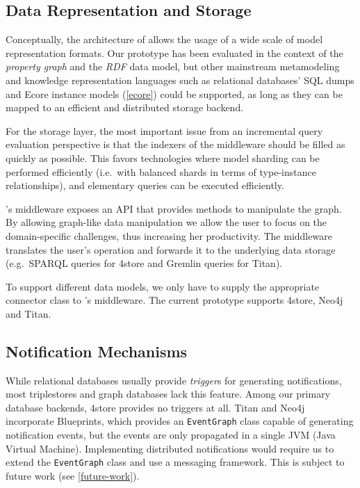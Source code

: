 \subsection{Data Representation and Storage}
\label{storage}

Conceptually, the architecture of \iqd{} allows the usage of a wide scale of model representation formats. Our prototype has been evaluated in the context of the \emph{property graph} and the \emph{RDF} data model, but other mainstream metamodeling and knowledge representation languages such as relational databases' SQL dumps and Ecore instance models (\autoref{ecore}) could be supported, as long as they can be mapped to an efficient and distributed storage backend.

For the storage layer, the most important issue from an incremental query evaluation perspective is that the indexers of the middleware should be filled as quickly as possible. This favors technologies where model sharding can be performed efficiently (i.e.\ with balanced shards in terms of type-instance relationships), and elementary queries can be executed efficiently.

\iqd{}'s middleware exposes an API that provides methods to manipulate the graph. By allowing graph-like data manipulation we allow the user to focus on the domain-specific challenges, thus increasing her productivity. The middleware translates the user's operation and forwards it to the underlying data storage (e.g.\ SPARQL queries for 4store and Gremlin queries for Titan).


To support different data models, we only have to supply the appropriate connector class to \iqd{}'s middleware. The current prototype supports 4store, Neo4j and Titan.

\subsection{Notification Mechanisms}

While relational databases usually provide \emph{trigger}s for generating notifications, most triplestores and graph databases lack this feature. Among our primary database backends, 4store provides no triggers at all. Titan and Neo4j incorporate Blueprints, which provides an \texttt{EventGraph} class capable of generating notification events, but the events are only propagated in a single JVM (Java Virtual Machine). Implementing distributed notifications would require us to extend the \texttt{EventGraph} class and use a messaging framework. This is subject to future work (see \autoref{future-work}). 

